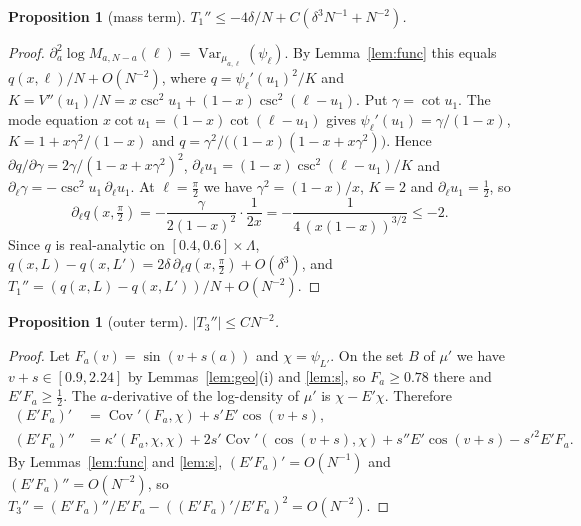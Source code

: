 \documentclass[11pt]{amsart}
\newtheorem{proposition}[theorem]{Proposition}
\theoremstyle{definition}
\begin{document}
\begin{proposition}[mass term]\label{prop:T1}
$T_1''\le-4\delta/N+C(\delta^3N^{-1}+N^{-2})$.
\end{proposition}
\begin{proof}
$\partial_a^2\log M_{a,N-a}(\ell)=\operatorname{Var}_{\mu_{a,\ell}}(\psi_\ell)$. By Lemma~\ref{lem:func} this equals $q(x,\ell)/N+O(N^{-2})$, where
$q=\psi_\ell'(u_1)^2/K$ and $K=V''(u_1)/N=x\csc^2u_1+(1-x)\csc^2(\ell-u_1)$. Put $\gamma=\cot u_1$. The mode equation $x\cot u_1=(1-x)\cot(\ell-u_1)$ gives
$\psi_\ell'(u_1)=\gamma/(1-x)$, $K=1+x\gamma^2/(1-x)$ and $q=\gamma^2/\big((1-x)(1-x+x\gamma^2)\big)$. Hence $\partial q/\partial\gamma=2\gamma/(1-x+x\gamma^2)^2$,
$\partial_\ell u_1=(1-x)\csc^2(\ell-u_1)/K$ and $\partial_\ell\gamma=-\csc^2u_1\,\partial_\ell u_1$. At $\ell=\frac\pi2$ we have $\gamma^2=(1-x)/x$, $K=2$ and $\partial_\ell u_1=\frac12$, so
\[
\partial_\ell q(x,\tfrac\pi2)=-\frac\gamma{2(1-x)^2}\cdot\frac1{2x}=-\frac1{4\,(x(1-x))^{3/2}}\le-2 .
\]
Since $q$ is real-analytic on $[0.4,0.6]\times\Lambda$, $q(x,L)-q(x,L')=2\delta\,\partial_\ell q(x,\frac\pi2)+O(\delta^3)$, and
$T_1''=(q(x,L)-q(x,L'))/N+O(N^{-2})$.
\end{proof}

\begin{proposition}[outer term]\label{prop:T3}
$|T_3''|\le CN^{-2}$.
\end{proposition}
\begin{proof}
Let $F_a(v)=\sin(v+s(a))$ and $\chi=\psi_{L'}$. On the set $B$ of $\mu'$ we have $v+s\in[0.9,2.24]$ by Lemmas~\ref{lem:geo}(i) and \ref{lem:s}, so
$F_a\ge0.78$ there and $E'F_a\ge\frac12$. The $a$-derivative of the log-density of $\mu'$ is $\chi-E'\chi$. Therefore
\begin{align*}
(E'F_a)'&=\operatorname{Cov}'(F_a,\chi)+s'E'\cos(v+s),\\
(E'F_a)''&=\kappa'(F_a,\chi,\chi)+2s'\operatorname{Cov}'(\cos(v+s),\chi)+s''E'\cos(v+s)-s'^2E'F_a .
\end{align*}
By Lemmas~\ref{lem:func} and \ref{lem:s}, $(E'F_a)'=O(N^{-1})$ and $(E'F_a)''=O(N^{-2})$, so
$T_3''=(E'F_a)''/E'F_a-((E'F_a)'/E'F_a)^2=O(N^{-2})$.
\end{proof}
\end{document}
